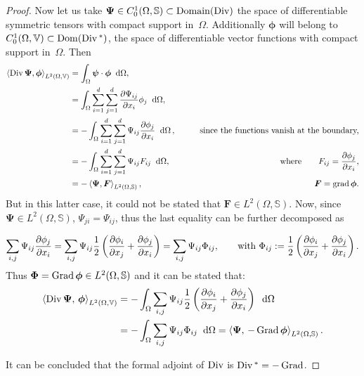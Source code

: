 \begin{theorem}
\begin{proof}
		Now let us take $\bm{\Psi} \in {C}_0^1(\Omega, \mathbb{S}) \subset \mathrm{Domain}(\operatorname*{Div})$ the space of differentiable symmetric tensors with compact support in~$\Omega$. Additionally $\bm{\phi}$ will belong to ${C}_0^1(\Omega, \mathbb{V}) \subset \mathrm{Dom}(\operatorname*{Div}{}^*)$, the space of differentiable vector functions with compact support in~$\Omega$. Then
		\begin{equation*}
		\begin{aligned}
		\left\langle \Div\bm{\Psi} , \bm{\phi} \right\rangle_{L^2(\Omega, \mathbb{V})} &= \int_{\Omega}  \bm{\psi} \cdot \bm{\phi} \; \d\Omega, \\
		&= \int_{\Omega} \sum_{i=1}^d \sum_{j=1}^d \diffp{\Psi_{ij}}{x_i} \phi_j \; \d\Omega,  \\ 
		&= - \int_{\Omega} \sum_{i=1}^d \sum_{j=1}^d \Psi_{ij} \diffp{\phi_j}{x_i} \; \d\Omega\,, \qquad &\text{since the functions vanish at the boundary,}\\
		&= - \int_{\Omega} \sum_{i=1}^d \sum_{j=1}^d \Psi_{ij} {F}_{ij} \;\d\Omega,  \qquad &\where {F}_{ij} = \diffp{\phi_j}{x_i},\\
		&= - \left\langle \bm{\Psi} , \bm{F} \right\rangle_{L^2(\Omega, \mathbb{S})},  \qquad &\bm{F} = \grad{\bm\phi}.
		\end{aligned}	 
		\end{equation*}
		But in this latter case, it could not  be stated that $\bm{F} \in L^2(\Omega, \mathbb{S})$. Now, since  $\bm{\Psi} \in L^2(\Omega, \mathbb{S})$, $\Psi_{ji}=\Psi_{ij}$,  thus the last equality can be further decomposed as
		
		\begin{equation*} \sum_{i,j}\Psi_{ij} \diffp{\phi_j}{x_i} = \sum_{i,j}\Psi_{ij} \frac{1}{2} \left(\diffp{\phi_i}{x_j} + \diffp{\phi_j}{x_i}  \right) = 	\sum_{i,j} \Psi_{ij} {\Phi}_{ij}, \qquad \text{with } {\Phi}_{ij}:= \frac{1}{2} \left(\diffp{\phi_i}{x_j} + \diffp{\phi_j}{x_i}  \right).
		\end{equation*}
		Thus $\bm{\Phi}=\operatorname*{Grad} \bm{\phi} \in L^2(\Omega, \mathbb{S})$ and it can be stated that:
		\begin{align*}
		\inner[L^2(\Omega, \mathbb{V})]{\Div\bm{\Psi}}{\bm{\phi}} &= - \int_{\Omega} \sum_{i,j} \Psi_{ij} \frac{1}{2} \left(\diffp{\phi_i}{x_j} + \diffp{\phi_j}{x_i}  \right) \;\d\Omega \\
		&= - \int_{\Omega} \sum_{i,j} \Psi_{ij} \Phi_{ij} \;\d\Omega = \inner[L^2(\Omega, \mathbb{S})]{\bm{\Psi}}{-\Grad \bm{\phi}}.
		\end{align*}

		It can be concluded that the formal adjoint of $\operatorname*{Div}$ is $\operatorname*{Div}{}^* = -\operatorname*{Grad}$.
	\end{proof}
\end{theorem}


